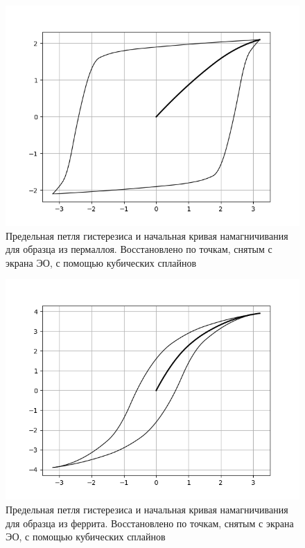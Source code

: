 \documentclass[a4paper, 12pt]{article}
\begin{document}
\begin{figure}[h]
	\centering
	\includegraphics[scale=0.75]{Loop_1}
	\caption{Предельная петля гистерезиса и начальная кривая намагничивания для образца из пермаллоя. Восстановлено по точкам, снятым с экрана ЭО, с помощью кубических сплайнов} \label{Loop_1}
\end{figure}

\begin{figure}[h]
	\centering
	\includegraphics[scale=0.75]{Loop_2}
	\caption{Предельная петля гистерезиса и начальная кривая намагничивания для образца из феррита. Восстановлено по точкам, снятым с экрана ЭО, с помощью кубических сплайнов} \label{Loop_2}
\end{figure}
\end{document}
